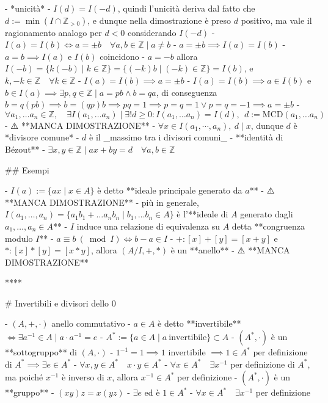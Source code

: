   - *unicità*
    - \( I(d)=I(-d)\), quindi l'unicità deriva dal fatto che $d:=\min(I \cap \mathbb{Z}_{\gt 0})$, e dunque nella dimostrazione è preso $d$ positivo, ma vale il ragionamento analogo per $d < 0$ considerando $I(-d)$
      - \( I(a)=I(b) \iff a=\pm b \quad \forall a, b \in \mathbb{Z} \mid a \neq b\)
        - \( a=\pm b \implies I(a)=I(b) \)
          - $a = b \implies I(a)$ e $I(b)$ coincidono
          - $a = -b$ allora $I(-b) = \{ k(-b) \mid k \in \mathbb{Z}\} = \{(-k)b \mid (-k) \in \mathbb{Z}\} = I(b)$, e $k, -k \in \mathbb{Z} \quad \forall k \in \mathbb{Z}$
        - $I(a) = I(b) \implies a = \pm b$
          - $I(a) = I(b) \implies a \in I(b)$ e $b \in I(a) \implies \exists p, q \in \mathbb{Z} \mid a = pb \wedge b = qa$, di conseguenza $b = q (pb) \implies b = (qp)b \implies pq = 1 \implies p = q = 1 \lor p = q = -1 \implies a = \pm b$
- \( \forall a_{1}, \ldots a_{n} \in \mathbb{Z}, \quad \exists I\left(a_{1}, \ldots a_{n}\right) \mid \exists ! d \geq 0  : I\left(a_{1}, \ldots a_{n}\right)=I(d),   \ \ d:=\textrm{MCD}(a_{1}, \ldots a_{n}) \)
    - ⚠️ **MANCA DIMOSTRAZIONE**
    - $\forall x \in I(a_1, \cdots, a_n), \ d \mid x$, dunque $d$ è *divisore comune*
    - $d$ è il _massimo tra i divisori comuni_
  - **identità di Bézout**
    - \( \exists x, y \in \mathbb{Z} \mid a x+b y=d \quad \forall a, b \in \mathbb{Z} \)

## Esempi

- $I(a) := \{ax \mid x \in A\}$ è detto **ideale principale generato da $a$**
    - ⚠️ **MANCA DIMOSTRAZIONE**
- più in generale, $I(a_1, \ldots, a_n) = \{ a_1b_1 + \ldots a_nb_n \mid b_1, \ldots b_n \in A\}$ è l'**ideale di $A$ generato dagli $a_1, \ldots, a_n \in A$**
  - $I$ induce una relazione di equivalenza su $A$ detta **congruenza modulo $I$**
    - $a \equiv b \ (\bmod I) \iff b - a \in I$
- $+: [x] + [y] = [x + y]$ e $*: [x] * [y] = [x * y]$, allora $(A/I, +, *)$ è un **anello**
  - ⚠️ **MANCA DIMOSTRAZIONE**

 ****

# Invertibili e divisori dello $0$

- $(A, +, \cdot)$ anello commutativo
  - $a \in A$ è detto **invertibile** \( \iff \exists a^{-1} \in A \mid a \cdot a^{-1}=e \)
    - $A^* := \{a \in A \mid a \ \textrm{invertibile}\} \subset A$
    - $(A^*, \cdot)$ è un **sottogruppo** di $(A, \cdot)$
      - $1^{-1} = 1 \implies 1$ invertibile $\implies 1 \in A^*$ per definizione di $A^* \implies \exists e \in A^*$
      - \( \forall x, y \in A^{*} \quad x \cdot y \in A^{*} \)
      - \( \forall x \in A^{*} \quad \exists x^{-1} \) per definizione di $A^*$, ma poiché $x^{-1}$ è inverso di $x$, allora $x^{-1} \in A^*$ per definizione
    - $(A^*, \cdot)$ è un **gruppo**
      - $(xy)z = x(yz)$
      - $\exists e$ ed è $1 \in A^*$
      - \( \forall x \in A^{*} \quad \exists x^{-1}\) per definizione

